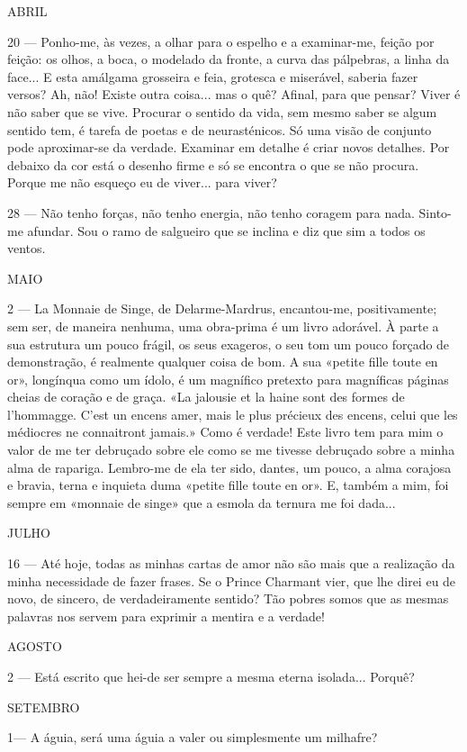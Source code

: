 ABRIL

20 — Ponho-me, às vezes, a olhar para o espelho e a
examinar-me, feição por feição: os olhos, a boca, o 
modelado da fronte, a curva das pálpebras, a linha da face...
E esta amálgama grosseira e feia, grotesca e miserável,
saberia fazer versos? Ah, não! Existe outra coisa...
mas o quê? Afinal, para que pensar? Viver é não saber
que se vive. Procurar o sentido da vida, sem mesmo
saber se algum sentido tem, é tarefa de poetas e de
neurasténicos. Só uma visão de conjunto pode 
aproximar-se da verdade. Examinar em detalhe é criar novos
detalhes. Por debaixo da cor está o desenho firme e só
se encontra o que se não procura. Porque me não
esqueço eu de viver... para viver?

28 — Não tenho forças, não tenho energia, não tenho
coragem para nada. Sinto-me afundar. Sou o ramo de
salgueiro que se inclina e diz que sim a todos os
ventos.

MAIO

2 — La Monnaie de Singe, de Delarme-Mardrus,
encantou-me, positivamente; sem ser, de maneira 
nenhuma, uma obra-prima é um livro adorável. À parte a
sua estrutura um pouco frágil, os seus exageros, o seu
tom um pouco forçado de demonstração, é realmente
qualquer coisa de bom. A sua «petite fille toute en or»,
longínqua como um ídolo, é um magnífico pretexto para
magníficas páginas cheias de coração e de graça. «La
jalousie et la haine sont des formes de l’hommagge.
C’est un encens amer, mais le plus précieux des encens,
celui que les médiocres ne connaitront jamais.» Como
é verdade! Este livro tem para mim o valor de me ter
debruçado sobre ele como se me tivesse debruçado sobre
a minha alma de rapariga. Lembro-me de ela ter sido,
dantes, um pouco, a alma corajosa e bravia, terna e
inquieta duma «petite fille toute en or». E, também a
mim, foi sempre em «monnaie de singe» que a esmola
da ternura me foi dada...

JULHO

16 — Até hoje, todas as minhas cartas de amor não
são mais que a realização da minha necessidade de fazer
frases. Se o Prince Charmant vier, que lhe direi eu
de novo, de sincero, de verdadeiramente sentido? Tão
pobres somos que as mesmas palavras nos servem para
exprimir a mentira e a verdade!

AGOSTO

2 — Está escrito que hei-de ser sempre a mesma eterna
isolada... Porquê?

SETEMBRO

1— A águia, será uma águia a valer ou simplesmente
um milhafre?

